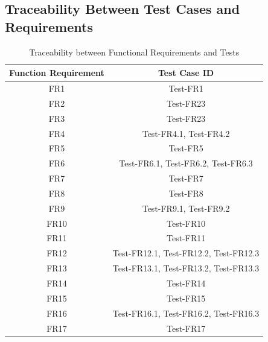 \documentclass[12pt, titlepage]{article}
\begin{document}
\subsection{Traceability Between Test Cases and Requirements}
\begin{table}[H]
    \centering
    \begin{tabular}{|c|c|}
    \hline
    Function Requirement     &  Test Case ID\\
    \hline
    FR1     & Test-FR1\\
    \hline
    FR2 & Test-FR23\\
    \hline
    FR3 & Test-FR23\\
    \hline
     FR4 & Test-FR4.1, Test-FR4.2\\
    \hline
     FR5 & Test-FR5\\
    \hline
     FR6 & Test-FR6.1, Test-FR6.2, Test-FR6.3\\
    \hline
     FR7 & Test-FR7\\
    \hline
     FR8 & Test-FR8\\
    \hline
     FR9 & Test-FR9.1, Test-FR9.2\\
    \hline
     FR10 & Test-FR10\\
    \hline
     FR11 & Test-FR11\\
    \hline 
     FR12 & Test-FR12.1, Test-FR12.2, Test-FR12.3\\
    \hline
    FR13 & Test-FR13.1, Test-FR13.2, Test-FR13.3\\
    \hline
    FR14 & Test-FR14\\
    \hline
    FR15 & Test-FR15\\
    \hline
    FR16 & Test-FR16.1, Test-FR16.2, Test-FR16.3\\
    \hline
    FR17 & Test-FR17\\
    \hline
    \end{tabular}
    \caption{Traceability between Functional Requirements and Tests}
\end{table}
\newpage
\end{document}
